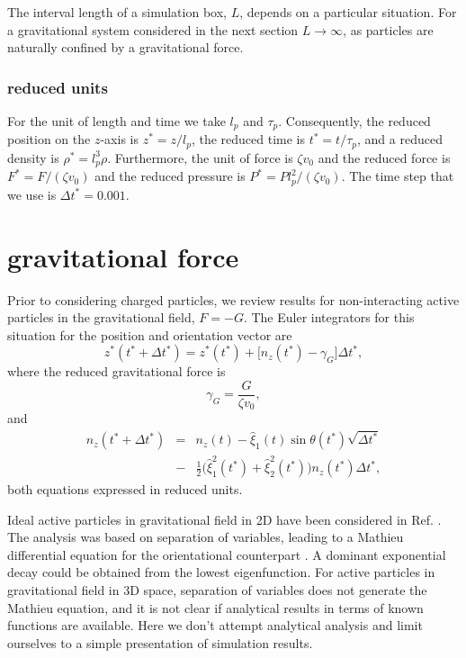 \documentclass[pre,twocolumn,graphicx]{revtex4-1}
\newcommand{\ba}{\begin{eqnarray}}
\newcommand{\ea}{\end{eqnarray}}
\newcommand{\be}{\begin{equation}}
\newcommand{\ee}{\end{equation}}
\begin{document}
The interval length of a simulation box, $L$, depends on a particular situation.  For a gravitational 
system considered in the next section $L\to\infty$, as particles are naturally confined by a gravitational force.  


\subsubsection{reduced units}
For the unit of length and time we take $l_p$ and $\tau_p$.  Consequently, the reduced position 
on the $z$-axis is $z^*=z/l_p$, the reduced time is $t^*=t/\tau_p$, and a reduced density is $\rho^*=l_p^3\rho$.  
Furthermore, the unit of force is $\zeta v_0$ and the reduced force is $F^*=F/(\zeta v_0)$ and
the reduced pressure is $P^*=P l_p^2/(\zeta v_0)$.
The time step that we use is $\Delta t^*=0.001$.  







\section{gravitational force}
\label{sec:gravity}

Prior to considering charged particles, we review results for non-interacting active particles 
in the gravitational field, $F=-G$.  The Euler integrators for this situation for the position and 
orientation vector are 
\be
z^*(t^*+\Delta t^*) = z^*(t^*) + \big[n_z(t^*) -   \gamma_G\big]\Delta t^*,
\label{eq:zg}
\ee
where the reduced gravitational force is 
\be
\gamma_G = \frac{G}{\zeta v_0}, 
\label{eq:gammaG}
\ee   
and 
\ba
n_z(t^*+\Delta t^*) &=& n_z(t) - \hat\xi_1(t)\sin\theta(t^*) \sqrt{\Delta t^*} \nonumber\\ 
&-& \frac{1}{2}\big(\hat\xi_{1}^2(t^*) + \hat\xi_{2}^2(t^*)\big)n_z(t^*)\Delta t^*,
\ea
both equations expressed in reduced units.  

Ideal active particles in gravitational field in 2D have been considered in Ref. \cite{Cates15c,Wagner17}.  
The analysis was based on separation of variables, leading to a Mathieu differential equation 
for the orientational counterpart \cite{Mathieu1868,Ruby96,Frenkel01}.  A dominant exponential decay could 
be obtained from the lowest eigenfunction.  
For active particles in gravitational field in 3D space, separation of variables does not generate the Mathieu 
equation, and it is not clear if analytical results in terms of known functions are available.  
Here we don't attempt analytical analysis and limit ourselves to a simple presentation of simulation results.  
\end{document}
